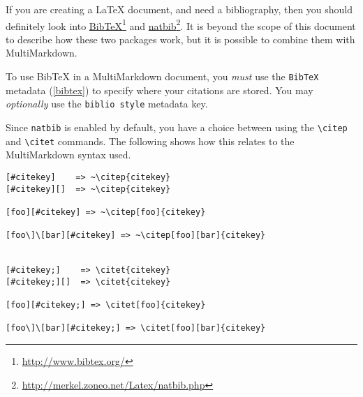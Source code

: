 If you are creating a LaTeX document, and need a bibliography, then you should definitely look into \href{http://www.bibtex.org/}{BibTeX}\footnote{\href{http://www.bibtex.org/}{http:\slash \slash www.bibtex.org\slash }} and \href{http://merkel.zoneo.net/Latex/natbib.php}{natbib}\footnote{\href{http://merkel.zoneo.net/Latex/natbib.php}{http:\slash \slash merkel.zoneo.net\slash Latex\slash natbib.php}}. It is beyond the scope of this document to describe how these two packages work, but it is possible to combine them with MultiMarkdown.

To use BibTeX in a MultiMarkdown document, you \emph{must} use the \texttt{BibTeX} metadata (\autoref{bibtex}) to specify where your citations are stored. You may \emph{optionally} use the \texttt{biblio style} metadata key.

Since \texttt{natbib} is enabled by default, you have a choice between using the \texttt{\textbackslash{}citep} and \texttt{\textbackslash{}citet} commands. The following shows how this relates to the MultiMarkdown syntax used.

\begin{verbatim}
[#citekey]    => ~\citep{citekey}
[#citekey][]  => ~\citep{citekey}

[foo][#citekey] => ~\citep[foo]{citekey}

[foo\]\[bar][#citekey] => ~\citep[foo][bar]{citekey}


[#citekey;]    => \citet{citekey}
[#citekey;][]  => \citet{citekey}

[foo][#citekey;] => \citet[foo]{citekey}

[foo\]\[bar][#citekey;] => \citet[foo][bar]{citekey}
\end{verbatim}



